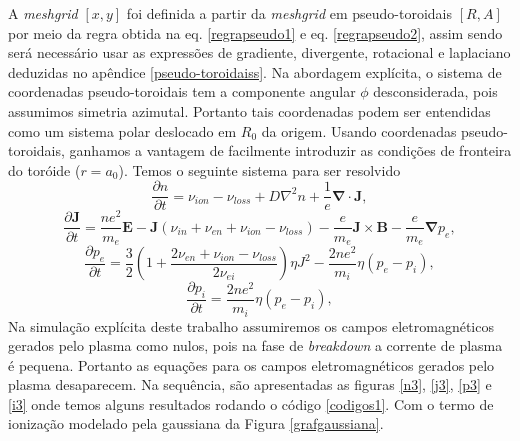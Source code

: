 \documentclass[12pt,oneside,a4paper]{abntex2}
\begin{document}
A \textit{meshgrid} $[x,y]$ foi definida a partir da \textit{meshgrid} em pseudo-toroidais $[R,A]$ por meio da regra obtida na eq. \ref{regrapseudo1} e eq. \ref{regrapseudo2}, assim sendo será necessário usar as expressões de gradiente, divergente, rotacional e laplaciano deduzidas no apêndice \ref{pseudo-toroidaiss}. %
Na abordagem explícita, o sistema de coordenadas pseudo-toroidais tem a componente angular $\phi$ desconsiderada, pois assumimos simetria azimutal. 
Portanto tais coordenadas podem ser entendidas como um sistema polar deslocado em $R_0$ da origem. 
Usando coordenadas pseudo-toroidais, ganhamos a vantagem de facilmente introduzir as condições de fronteira do toróide ($r=a_0$). 
Temos o seguinte sistema para ser resolvido
\begin{equation}
\frac{\partial n}{\partial t} = \nu_{ion} - \nu_{loss}+D\nabla^2n + \frac{1}{e} \bm{\nabla} \cdot \bm{J},
\end{equation}
\begin{equation}
\label{momenteletrico} 
\frac{\partial \bm{J}}{\partial t} =  \frac{ne^2}{m_e} \bm{E} -\bm{J}(\nu_{in}+\nu_{en}+\nu_{ion}-\nu_{loss}) -\frac{e}{m_e}\bm{J} \times \bm{B}-\frac{e}{m_e}\bm{\nabla} p_e,
\end{equation}
\begin{equation}
\frac{\partial p_e}{\partial t} = \frac{3}{2}(1+\frac{2 \nu_{en} + \nu_{ion} - \nu_{loss}}{2\nu_{ei}})\eta J^2  -\frac{2ne^2}{m_i} \eta (p_e-p_i),
\end{equation}
\begin{equation}
\frac{\partial p_i}{\partial t} = \frac{2ne^2}{m_i}\eta(p_e-p_i),
\end{equation}
Na simulação explícita deste trabalho assumiremos os campos eletromagnéticos gerados pelo plasma como nulos, pois na fase de \textit{breakdown} a corrente de plasma é pequena. 
Portanto as equações para os campos eletromagnéticos gerados pelo plasma desaparecem.
Na sequência, são apresentadas as figuras \ref{n3}, \ref{j3}, \ref{p3} e \ref{i3} onde temos alguns resultados rodando o código \ref{codigos1}. Com o termo de ionização modelado pela gaussiana da Figura \ref{grafgaussiana}. 
\end{document}
